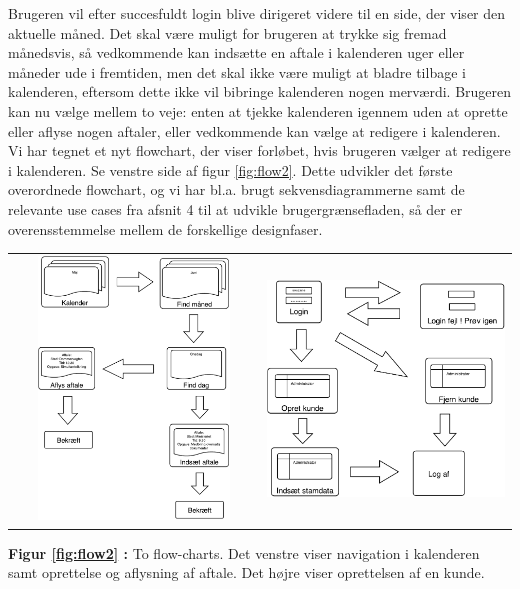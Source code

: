 \documentclass[12pt]{article}   %
\begin{document}
Brugeren vil efter succesfuldt login blive dirigeret videre til en side, der viser den aktuelle måned. Det skal være muligt for brugeren at trykke sig fremad månedsvis, så vedkommende kan indsætte en aftale i kalenderen uger eller måneder ude i fremtiden, men det skal ikke være muligt at bladre tilbage i kalenderen, eftersom dette ikke vil bibringe kalenderen nogen merværdi. Brugeren kan nu vælge mellem to veje: enten at tjekke kalenderen igennem uden at oprette eller aflyse nogen aftaler, eller vedkommende kan vælge at redigere i kalenderen. Vi har tegnet et nyt flowchart, der viser forløbet, hvis brugeren vælger at redigere i kalenderen. Se venstre side af figur \ref{fig:flow2}. Dette udvikler det første overordnede flowchart, og vi har bl.a. brugt sekvensdiagrammerne samt de relevante use cases fra afsnit 4 til at udvikle brugergrænsefladen, så der er overensstemmelse mellem de forskellige designfaser. \\


\begin{table}[ht]
\centering
\begin{tabular}{l | r}
\includegraphics[height=7cm,width=7cm]{flow2.pdf}
\label{fig:flow2}&
\includegraphics[height=7cm, width=7cm]{flow3.pdf}
\\
\end{tabular}
\label{tab:gt}
\end{table}
\begin{centering} \textbf{Figur \ref{fig:flow2} :} To flow-charts. Det venstre viser navigation i kalenderen samt oprettelse og aflysning af aftale. Det højre viser oprettelsen af en kunde. 
\end{centering}
\end{document}
